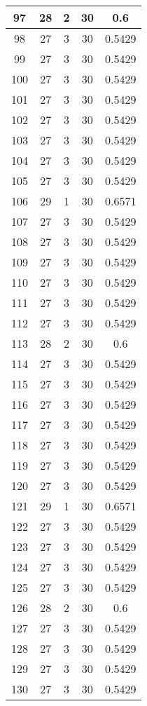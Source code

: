 \documentclass[letterpaper, 12pt]{article}
\begin{document}
\begin{longtable}{|c|c|c|c|c|}
\hline
97 & 28 & 2 & 30 & 0.6 \\
\hline
98 & 27 & 3 & 30 & 0.5429 \\
\hline
99 & 27 & 3 & 30 & 0.5429 \\
\hline
100 & 27 & 3 & 30 & 0.5429 \\
\hline
101 & 27 & 3 & 30 & 0.5429 \\
\hline
102 & 27 & 3 & 30 & 0.5429 \\
\hline
103 & 27 & 3 & 30 & 0.5429 \\
\hline
104 & 27 & 3 & 30 & 0.5429 \\
\hline
105 & 27 & 3 & 30 & 0.5429 \\
\hline
106 & 29 & 1 & 30 & 0.6571 \\
\hline
107 & 27 & 3 & 30 & 0.5429 \\
\hline
108 & 27 & 3 & 30 & 0.5429 \\
\hline
109 & 27 & 3 & 30 & 0.5429 \\
\hline
110 & 27 & 3 & 30 & 0.5429 \\
\hline
111 & 27 & 3 & 30 & 0.5429 \\
\hline
112 & 27 & 3 & 30 & 0.5429 \\
\hline
113 & 28 & 2 & 30 & 0.6 \\
\hline
114 & 27 & 3 & 30 & 0.5429 \\
\hline
115 & 27 & 3 & 30 & 0.5429 \\
\hline
116 & 27 & 3 & 30 & 0.5429 \\
\hline
117 & 27 & 3 & 30 & 0.5429 \\
\hline
118 & 27 & 3 & 30 & 0.5429 \\
\hline
119 & 27 & 3 & 30 & 0.5429 \\
\hline
120 & 27 & 3 & 30 & 0.5429 \\
\hline
121 & 29 & 1 & 30 & 0.6571 \\
\hline
122 & 27 & 3 & 30 & 0.5429 \\
\hline
123 & 27 & 3 & 30 & 0.5429 \\
\hline
124 & 27 & 3 & 30 & 0.5429 \\
\hline
125 & 27 & 3 & 30 & 0.5429 \\
\hline
126 & 28 & 2 & 30 & 0.6 \\
\hline
127 & 27 & 3 & 30 & 0.5429 \\
\hline
128 & 27 & 3 & 30 & 0.5429 \\
\hline
129 & 27 & 3 & 30 & 0.5429 \\
\hline
130 & 27 & 3 & 30 & 0.5429 \\

\end{longtable}
\end{document}
